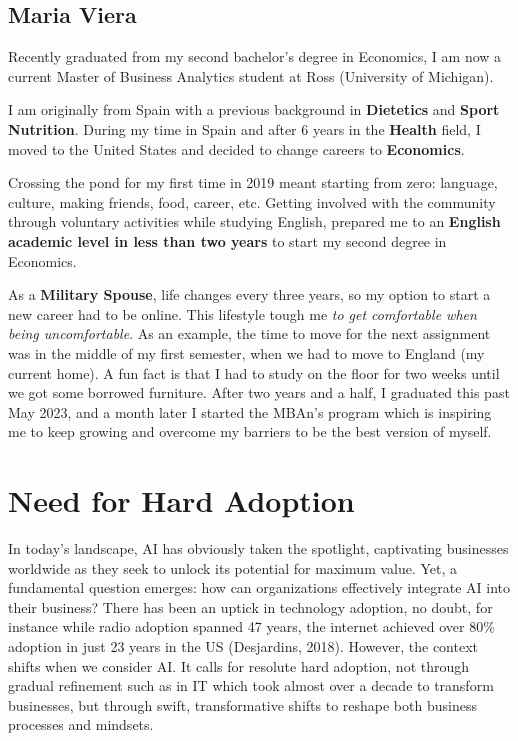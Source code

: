 \documentclass[
]{article}
\begin{document}
\hypertarget{maria-viera}{%
\subsection{Maria Viera}\label{maria-viera}}

Recently graduated from my second bachelor's degree in Economics, I am now a current Master of Business Analytics student at Ross (University of Michigan).

I am originally from Spain with a previous background in \textbf{Dietetics} and \textbf{Sport Nutrition}. During my time in Spain and after 6 years in the \textbf{Health} field, I moved to the United States and decided to change careers to \textbf{Economics}.

Crossing the pond for my first time in 2019 meant starting from zero: language, culture, making friends, food, career, etc. Getting involved with the community through voluntary activities while studying English, prepared me to an \textbf{English academic level in less than two years} to start my second degree in Economics.

As a \textbf{Military Spouse}, life changes every three years, so my option to start a new career had to be online. This lifestyle tough me \emph{to get comfortable when being uncomfortable}. As an example, the time to move for the next assignment was in the middle of my first semester, when we had to move to England (my current home). A fun fact is that I had to study on the floor for two weeks until we got some borrowed furniture. After two years and a half, I graduated this past May 2023, and a month later I started the MBAn's program which is inspiring me to keep growing and overcome my barriers to be the best version of myself.

\hypertarget{need-for-hard-adoption}{%
\section{Need for Hard Adoption}\label{need-for-hard-adoption}}

In today's landscape, AI has obviously taken the spotlight, captivating businesses worldwide as they seek to unlock its potential for maximum value. Yet, a fundamental question emerges: how can organizations effectively integrate AI into their business? There has been an uptick in technology adoption, no doubt, for instance while radio adoption spanned 47 years, the internet achieved over 80\% adoption in just 23 years in the US (Desjardins, 2018). However, the context shifts when we consider AI. It calls for resolute hard adoption, not through gradual refinement such as in IT which took almost over a decade to transform businesses, but through swift, transformative shifts to reshape both business processes and mindsets.
\end{document}
